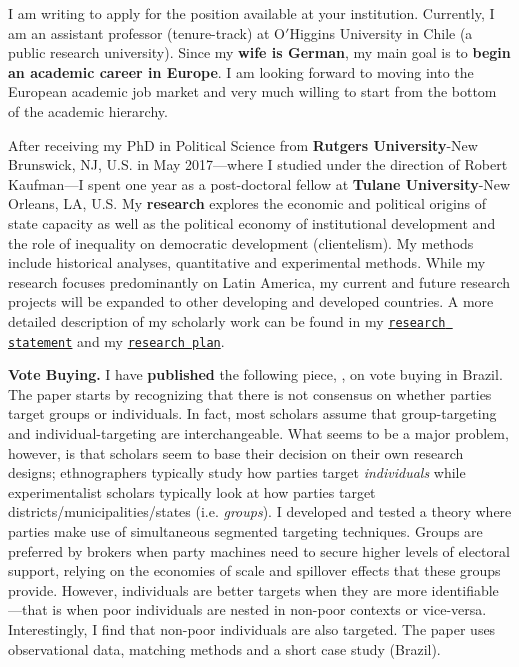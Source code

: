 \vspace{-0.3cm}I am writing to apply for the position available at your institution. Currently, I am an assistant professor (tenure-track) at O$'$Higgins University in Chile (a public research university). Since my {\bf wife is German}, my main goal is to {\bf begin an academic career in Europe}. I am looking forward to moving into the European academic job market and very much willing to start from the bottom of the academic hierarchy. 

After receiving my PhD in Political Science from {\bf Rutgers University}-New Brunswick, NJ, U.S. in May 2017---where I studied under the direction of Robert Kaufman---I spent one year as a post-doctoral fellow at {\bf Tulane University}-New Orleans, LA, U.S. My {\bf research} explores the economic and political origins of state capacity as well as the political economy of institutional development and the role of inequality on democratic development (clientelism). My methods include historical analyses, quantitative and experimental methods. While my research focuses predominantly on Latin America, my current and future research projects will be expanded to other developing and developed countries. A more detailed description of my scholarly work can be found in my \href{http://github.com/hbahamonde/Job_Market/raw/master/Bahamonde_Research_Statement.pdf}{\texttt{research statement}} and my \href{http://github.com/hbahamonde/Job_Market/raw/master/Bahamonde_Research_Plan.pdf}{\texttt{research plan}}.



{\bf Vote Buying.} I have {\bf published} the following piece, \emph{\unskip}, on vote buying in Brazil. The paper starts by recognizing that there is not consensus on whether parties target groups or individuals. In fact, most scholars assume that group-targeting and individual-targeting are interchangeable. What seems to be a major problem, however, is that scholars seem to base their decision on their own research designs; ethnographers typically study how parties target \emph{individuals} while experimentalist scholars typically look at how parties target districts/municipalities/states (i.e. \emph{groups}). I developed and tested a theory where parties make use of simultaneous segmented targeting techniques. Groups are preferred by brokers when party machines need to secure higher levels of electoral support, relying on the economies of scale and spillover effects that these groups provide. However, individuals are better targets when they are more identifiable---that is when poor individuals are nested in non-poor contexts or vice-versa. Interestingly, I find that non-poor individuals are also targeted. The paper uses observational data, matching methods and a short case study (Brazil).


